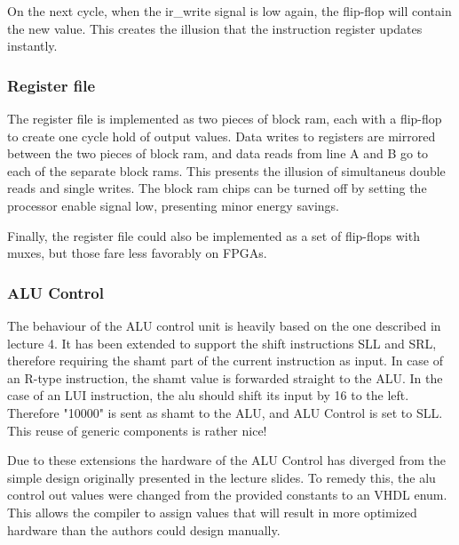 On the next cycle, when the ir\_write signal is low again, the flip-flop will contain the new value.
This creates the illusion that the instruction register updates instantly.

\subsubsection{Register file}

The register file is implemented as two pieces of block ram, each with a flip-flop to create one cycle hold of output values.
Data writes to registers are mirrored between the two pieces of block ram, and data reads from line A and B go to each of the separate block rams.
This presents the illusion of simultaneus double reads and single writes.
The block ram chips can be turned off by setting the processor enable signal low, presenting minor energy savings.

Finally, the register file could also be implemented as a set of flip-flops with muxes, but those fare less favorably on FPGAs.

\subsubsection{ALU Control}

The behaviour of the ALU control unit is heavily based on the one described in lecture 4\cite{lecture-4}.
It has been extended to support the shift instructions SLL and SRL, therefore requiring the shamt part of the current instruction as input.
In case of an R-type instruction, the shamt value is forwarded straight to the ALU.
In the case of an LUI instruction, the alu should shift its input by 16 to the left.
Therefore "10000" is sent as shamt to the ALU, and ALU Control is set to SLL.
This reuse of generic components is rather nice!

Due to these extensions the hardware of the ALU Control has diverged from the simple design originally presented in the lecture slides.
To remedy this, the alu control out values were changed from the provided constants to an VHDL enum.
This allows the compiler to assign values that will result in more optimized hardware than the authors could design manually.

